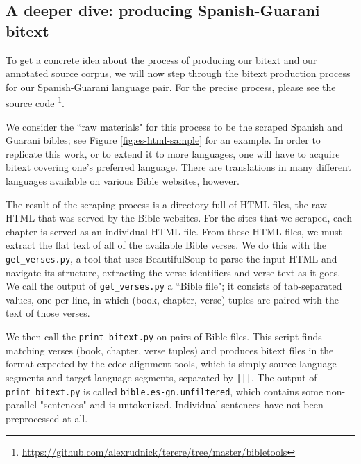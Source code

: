 



\subsection{A deeper dive: producing Spanish-Guarani bitext}
To get a concrete idea about the process of producing our bitext and our
annotated source corpus, we will now step through the bitext production process
for our Spanish-Guarani language pair. For the precise process, please see the
source code
\footnote{\url{https://github.com/alexrudnick/terere/tree/master/bibletools}}.

We consider the ``raw materials" for this process to be the scraped Spanish and
Guarani bibles; see Figure \ref{fig:es-html-sample} for an example.  In order
to replicate this work, or to extend it to more languages, one will have to
acquire bitext covering one's preferred language. There are translations in
many different languages available on various Bible websites, however.

The result of the scraping process is a directory full of HTML files, the raw
HTML that was served by the Bible websites. For the sites that we scraped, each
chapter is served as an individual HTML file. From these HTML files, we must
extract the flat text of all of the available Bible verses.  We do this with
the \texttt{get\_verses.py}, a tool that uses BeautifulSoup to parse the input
HTML and navigate its structure, extracting the verse identifiers and verse
text as it goes. We call the output of \texttt{get\_verses.py} a ``Bible file";
it consists of tab-separated values, one per line, in which (book, chapter,
verse) tuples are paired with the text of those verses.

We then call the \texttt{print\_bitext.py} on pairs of Bible files. This script
finds matching verses (book, chapter, verse tuples) and produces bitext files
in the format expected by the cdec alignment tools, which is simply
source-language segments and target-language segments, separated by
\texttt{|||}. The output of \texttt{print\_bitext.py} is called
\texttt{bible.es-gn.unfiltered}, which contains some non-parallel "sentences"
and is untokenized. Individual sentences have not been preprocessed at all.

